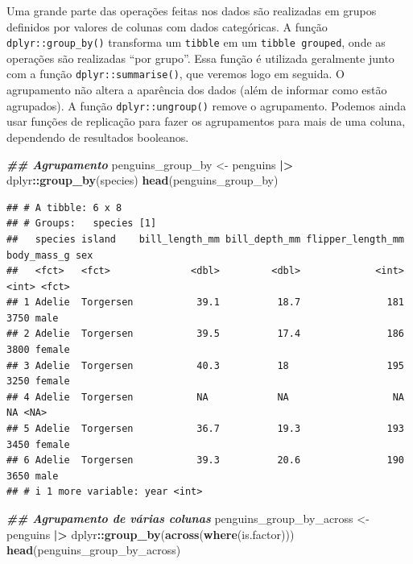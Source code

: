 \documentclass[
]{article}
\newenvironment{Shaded}{\begin{snugshade}}{\end{snugshade}}
\newcommand{\DocumentationTok}[1]{\textcolor[rgb]{0.56,0.35,0.01}{\textbf{\textit{#1}}}}
\newcommand{\FunctionTok}[1]{\textcolor[rgb]{0.13,0.29,0.53}{\textbf{#1}}}
\newcommand{\NormalTok}[1]{#1}
\newcommand{\OtherTok}[1]{\textcolor[rgb]{0.56,0.35,0.01}{#1}}
\newcommand{\SpecialCharTok}[1]{\textcolor[rgb]{0.81,0.36,0.00}{\textbf{#1}}}
\begin{document}
Uma grande parte das operações feitas nos dados são realizadas em grupos definidos por valores de colunas com dados categóricas. A função \texttt{dplyr::group\_by()} transforma um \texttt{tibble} em um \texttt{tibble\ grouped}, onde as operações são realizadas ``por grupo''. Essa função é utilizada geralmente junto com a função \texttt{dplyr::summarise()}, que veremos logo em seguida. O agrupamento não altera a aparência dos dados (além de informar como estão agrupados). A função \texttt{dplyr::ungroup()} remove o agrupamento. Podemos ainda usar funções de replicação para fazer os agrupamentos para mais de uma coluna, dependendo de resultados booleanos.

\begin{Shaded}
\begin{Highlighting}[]
\DocumentationTok{\#\# Agrupamento}
\NormalTok{penguins\_group\_by }\OtherTok{\textless{}{-}}\NormalTok{ penguins }\SpecialCharTok{|\textgreater{}} 
\NormalTok{    dplyr}\SpecialCharTok{::}\FunctionTok{group\_by}\NormalTok{(species)}
\FunctionTok{head}\NormalTok{(penguins\_group\_by)}
\end{Highlighting}
\end{Shaded}

\begin{verbatim}
## # A tibble: 6 x 8
## # Groups:   species [1]
##   species island    bill_length_mm bill_depth_mm flipper_length_mm body_mass_g sex   
##   <fct>   <fct>              <dbl>         <dbl>             <int>       <int> <fct> 
## 1 Adelie  Torgersen           39.1          18.7               181        3750 male  
## 2 Adelie  Torgersen           39.5          17.4               186        3800 female
## 3 Adelie  Torgersen           40.3          18                 195        3250 female
## 4 Adelie  Torgersen           NA            NA                  NA          NA <NA>  
## 5 Adelie  Torgersen           36.7          19.3               193        3450 female
## 6 Adelie  Torgersen           39.3          20.6               190        3650 male  
## # i 1 more variable: year <int>
\end{verbatim}

\begin{Shaded}
\begin{Highlighting}[]
\DocumentationTok{\#\# Agrupamento de várias colunas}
\NormalTok{penguins\_group\_by\_across }\OtherTok{\textless{}{-}}\NormalTok{ penguins }\SpecialCharTok{|\textgreater{}} 
\NormalTok{    dplyr}\SpecialCharTok{::}\FunctionTok{group\_by}\NormalTok{(}\FunctionTok{across}\NormalTok{(}\FunctionTok{where}\NormalTok{(is.factor)))}
\FunctionTok{head}\NormalTok{(penguins\_group\_by\_across)}
\end{Highlighting}
\end{Shaded}
\end{document}

